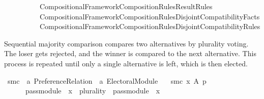 \begin{isabellebody}
\ \ \ \ \ \ \ \ \ \ {\isachardoublequoteopen}{\isachardot}{\kern0pt}{\isachardot}{\kern0pt}{\isacharslash}{\kern0pt}Compositional{\isacharunderscore}{\kern0pt}Framework{\isacharslash}{\kern0pt}Composition{\isacharunderscore}{\kern0pt}Rules{\isacharslash}{\kern0pt}Result{\isacharunderscore}{\kern0pt}Rules{\isachardoublequoteclose}\isanewline
\ \ \ \ \ \ \ \ \ \ {\isachardoublequoteopen}{\isachardot}{\kern0pt}{\isachardot}{\kern0pt}{\isacharslash}{\kern0pt}Compositional{\isacharunderscore}{\kern0pt}Framework{\isacharslash}{\kern0pt}Composition{\isacharunderscore}{\kern0pt}Rules{\isacharslash}{\kern0pt}Disjoint{\isacharunderscore}{\kern0pt}Compatibility{\isacharunderscore}{\kern0pt}Facts{\isachardoublequoteclose}\isanewline
\ \ \ \ \ \ \ \ \ \ {\isachardoublequoteopen}{\isachardot}{\kern0pt}{\isachardot}{\kern0pt}{\isacharslash}{\kern0pt}Compositional{\isacharunderscore}{\kern0pt}Framework{\isacharslash}{\kern0pt}Composition{\isacharunderscore}{\kern0pt}Rules{\isacharslash}{\kern0pt}Disjoint{\isacharunderscore}{\kern0pt}Compatibility{\isacharunderscore}{\kern0pt}Rules{\isachardoublequoteclose}\isanewline
\isanewline
{}%
\endisatagtheory
{\isafoldtheory}%
%
\isadelimtheory
%
\endisadelimtheory
%
\begin{isamarkuptext}%
Sequential majority comparison compares two alternatives by plurality voting.
The loser gets rejected, and the winner is compared to the next alternative.
This process is repeated until only a single alternative is left, which is
then elected.%
\end{isamarkuptext}\isamarkuptrue%
%
\isadelimdocument
%
\endisadelimdocument
%
\isatagdocument
%
\isamarkuptrue%
%
\endisatagdocument
{\isafolddocument}%
%
\isadelimdocument
%
\endisadelimdocument
{}\isamarkupfalse%
\ smc\ {\isacharcolon}{\kern0pt}{\isacharcolon}{\kern0pt}\ {\isachardoublequoteopen}{\isacharprime}{\kern0pt}a\ Preference{\isacharunderscore}{\kern0pt}Relation\ {\isasymRightarrow}\ {\isacharprime}{\kern0pt}a\ Electoral{\isacharunderscore}{\kern0pt}Module{\isachardoublequoteclose}\ \isanewline
\ \ {\isachardoublequoteopen}smc\ x\ A\ p\ {\isacharequal}{\kern0pt}\isanewline
\ \ \ \ \ \ {\isacharparenleft}{\kern0pt}{\isacharparenleft}{\kern0pt}{\isacharparenleft}{\kern0pt}{\isacharparenleft}{\kern0pt}{\isacharparenleft}{\kern0pt}{\isacharparenleft}{\kern0pt}pass{\isacharunderscore}{\kern0pt}module\ {}\ x{\isacharparenright}{\kern0pt}\ {\isasymtriangleright}\ {\isacharparenleft}{\kern0pt}{\isacharparenleft}{\kern0pt}plurality{\isasymdown}{\isacharparenright}{\kern0pt}\ {\isasymtriangleright}\ {\isacharparenleft}{\kern0pt}pass{\isacharunderscore}{\kern0pt}module\ {}\ x{\isacharparenright}{\kern0pt}{\isacharparenright}{\kern0pt}{\isacharparenright}{\kern0pt}\ {\isasymparallel}\isactrlsub {\isasymup}\isanewline

\end{isabellebody}
